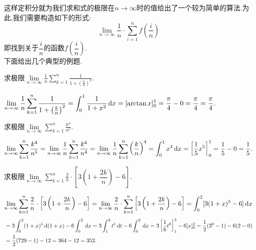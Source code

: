 这样定积分就为我们求和式的极限在$n \to \infty$时的值给出了一个较为简单的算法.为此,我们需要构造如下的形式:
\begin{equation}
	\lim\limits_{n \to \infty} \frac{1}{n}\cdot \sum_{i=1}^{n}f\left(\frac{i}{n}\right)
\end{equation}
即找到关于$\dfrac{i}{n}$的函数$f\left(\dfrac{i}{n}\right)$.\\[0.5em]
下面给出几个典型的例题.

\examples 求极限$\displaystyle \lim\limits_{n \to \infty}\frac 1n \sum_{k=1}^{n}\frac{1}{1+\left( \frac{k}{n}\right)^2 }$.

\solve $\displaystyle \lim\limits_{n \to \infty}\frac 1n \sum_{k=1}^{n}\frac{1}{1+\left( \frac{k}{n}\right)^2 }=\int_{0}^{1}\frac{1}{1+x^2}\,{\rm{d}} x=[\arctan x]_0^1=\frac{\pi}{4}-0=\frac{\pi}{4}=\frac{\pi}{4}.$

\summarize
[
\kg 本题的被积函数为$f(x)=\dfrac{1}{1+x^2},$可以代入验证$\displaystyle f\left(\dfrac{k}{n} \right)=\dfrac{1}{\textstyle 1+\left(\frac{k}{n} \right)} $.
]
\clearpage
\vspace*{-3em}
\examples 求极限$\displaystyle \lim\limits_{n \to \infty}\sum_{k=1}^{n}\frac{k^4}{n^5 }$.

\solve $\displaystyle \lim\limits_{n \to \infty}\sum_{k=1}^{n}\frac{k^4}{n^5 }=\lim\limits_{n \to \infty} \frac 1n \sum_{k=1}^{n}\frac{k^4}{n^4}=\lim\limits_{n \to \infty} \frac 1n \sum_{k=1}^{n}\left( \frac{k}{n}\right)^4=\int_{0}^{1} x^4 \, {\rm{d}} x = \left[\frac 15 x^5 \right]_0^1=\frac 15-0=\frac 15.$
\vspace{1em}

\examples 求极限$\displaystyle \lim\limits_{n \to \infty}\sum_{k=1}^{n}\frac{2}{n}\cdot \left[3\left( 1+\dfrac{2k}{n}\right)  -6\right] $.

\solve 
$
\displaystyle
\lim\limits_{n \to \infty}\sum_{k=1}^{n}\frac{2}{n}\cdot \left[3\left( 1+\dfrac{2k}{n}\right)  -6\right]
=\lim\limits_{n \to \infty}\frac{2}{n} \cdot \sum_{k=1}^{n}\left[3\left( 1+\dfrac{2k}{n}\right)  -6\right]
=\int_{0}^{2}[3(1+x)^5-6]\,{\rm{d}} x
$
\begin{align*}
	&=3\int_{0}^{2}(1+x)^5\,\d(1+x)-6\int_{0}^{2}\,\d x=3\int_{1}^{3}t^5\,\d t-6\int_{0}^{2}\,\d x=3\left[\frac 16 t^6\right]_1^3-6[x]_0^2=\frac{1}{2}(3^6-1)-6(2-0)\\
	&=\frac 12(729-1)-12=364-12=352.
	\vspace*{-2em}
\end{align*}


